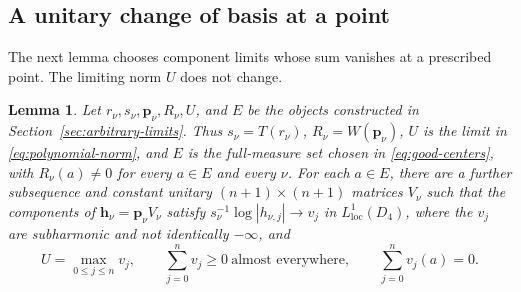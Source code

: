 \documentclass[11pt,letterpaper,reqno]{amsart}
\newtheorem{lem}[thm]{Lemma}
\theoremstyle{remark}
\numberwithin{equation}{section}
\newcommand{\loc}{\mathrm{loc}}
\newcommand{\pv}{\bm p}
\newcommand{\hv}{\bm h}
\begin{document}
\subsection{A unitary change of basis at a point}

The next lemma chooses component limits whose sum vanishes at a
prescribed point. The limiting norm $U$ does not change.

\begin{lem}\label{lem:basis-at-point}
Let $r_\nu,s_\nu,\pv_\nu,R_\nu,U$, and $E$ be the objects constructed
in Section~\ref{sec:arbitrary-limits}. Thus $s_\nu=T(r_\nu)$,
$R_\nu=W(\pv_\nu)$,
$U$ is the limit in \eqref{eq:polynomial-norm}, and $E$ is the full-measure
set chosen in \eqref{eq:good-centers}, with $R_\nu(a)\ne0$ for every
$a\in E$ and every $\nu$. For each $a\in E$, there are a further
subsequence and constant unitary $(n+1)\times(n+1)$ matrices $V_\nu$
such that the components of $\hv_\nu=\pv_\nu V_\nu$ satisfy
$s_\nu^{-1}\log|h_{\nu,j}|\to v_j$ in $L^1_{\loc}(D_4)$, where the
$v_j$ are subharmonic and not identically $-\infty$, and
\begin{equation}\label{eq:point-balance}
 U=\max_{0\leq j\leq n}v_j,
 \qquad \sum_{j=0}^{n}v_j\geq0\ \text{almost everywhere},
 \qquad \sum_{j=0}^{n}v_j(a)=0.
\end{equation}
\end{lem}
\end{document}
